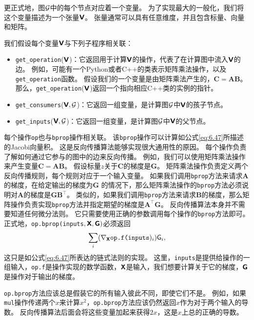 更正式地，图$\mathcal{G}$中的每个节点对应着一个变量。
为了实现最大的一般化，我们将这个变量描述为一个张量$\textsf{\textbf{V}}$。
张量通常可以具有任意维度，并且包含标量、向量和矩阵。

我们假设每个变量$\textsf{\textbf{V}}$与下列子程序相关联：
\begin{itemize}
    \item \verb|get_operation|($\textsf{\textbf{V}}$)：它返回用于计算$\textsf{\textbf{V}}$的操作，代表了在计算图中流入$\textsf{\textbf{V}}$的边。
    例如，可能有一个Python或者C++的类表示矩阵乘法操作，以及\verb|get_operation|函数。
    假设我们的一个变量是由矩阵乘法产生的，$\bm{C}=\bm{A}\bm{B}$。
    那么，\verb|get_operation|($\textsf{\textbf{V}}$)返回一个指向相应C++类的实例的指针。

    \item \verb|get_consumers|($\textsf{\textbf{V}}, \mathcal{G}$)：它返回一组变量，是计算图$\mathcal{G}$中$\textsf{\textbf{V}}$的孩子节点。

    \item \verb|get_inputs|($\textsf{\textbf{V}}, \mathcal{G}$)：它返回一组变量，是计算图$\mathcal{G}$中$\textsf{\textbf{V}}$的父节点。
\end{itemize}

  
每个操作\verb|op|也与\verb|bprop|操作相关联。
该\verb|bprop|操作可以计算如公式\ref{eq:6.47}所描述的Jacobi向量积。
这是反向传播算法能够实现很大通用性的原因。
每个操作负责了解如何通过它参与的图中的边来反向传播。
例如，我们可以使用矩阵乘法操作来产生变量$\bm{C}=\bm{A}\bm{B}$。
假设标量$z$关于$\bm{C}$的梯度是$\bm{G}$。
矩阵乘法操作负责定义两个反向传播规则，每个规则对应于一个输入变量。
如果我们调用\verb|bprop|方法来请求$\bm{A}$的梯度，在给定输出的梯度为$\bm{G}$ 的情况下，那么矩阵乘法操作的\verb|bprop|方法必须说明对$\bm{A}$的梯度是$\bm{G}\bm{B}^\top$。
类似的，如果我们调用\verb|bprop|方法来请求$\bm{B}$的梯度，那么矩阵操作负责实现\verb|bprop|方法并指定期望的梯度是$\bm{A}^\top\bm{G}$。
反向传播算法本身并不需要知道任何微分法则。
它只需要使用正确的参数调用每个操作的\verb|bprop|方法即可。
正式地，\verb|op.bprop(inputs|$, \textsf{\textbf{X}}, \textsf{\textbf{G}})$必须返回
\begin{equation}
  \sum_i (\nabla_{\TSX} \verb|op.f(inputs|)_i) \textsf{G}_i,
\end{equation}
这只是如公式\ref{eq:6.47}所表达的链式法则的实现。
这里，\verb|inputs|是提供给操作的一组输入，\verb|op.f|是操作实现的数学函数，$\textsf{\textbf{X}}$是输入，我们想要计算关于它的梯度，$\textsf{\textbf{G}}$是操作对于输出的梯度。

\verb|op.bprop|方法应该总是假装它的所有输入彼此不同，即使它们不是。
例如，如果\verb|mul|操作传递两个$x$来计算$x^2$，\verb|op.bprop|方法应该仍然返回$x$作为对于两个输入的导数。
反向传播算法后面会将这些变量加起来获得$2x$，这是$x$上总的正确的导数。

